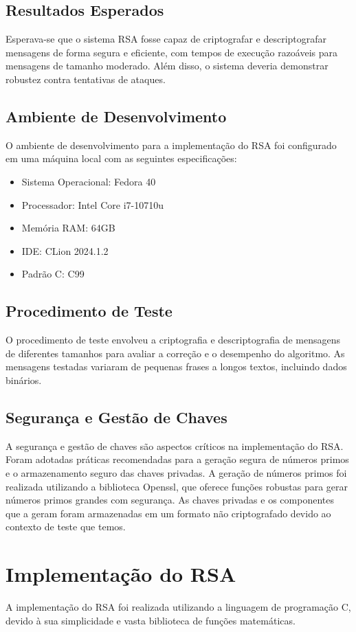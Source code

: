 \documentclass[a4paper,12pt]{article}
\begin{document}
\subsection*{Resultados Esperados}
Esperava-se que o sistema RSA fosse capaz de criptografar e descriptografar mensagens de forma segura e eficiente, com tempos de execução razoáveis para mensagens de tamanho moderado. Além disso, o sistema deveria demonstrar robustez contra tentativas de ataques.

\subsection*{Ambiente de Desenvolvimento}
O ambiente de desenvolvimento para a implementação do RSA foi configurado em uma máquina local com as seguintes especificações:
\begin{itemize}
    \item Sistema Operacional: Fedora 40
    \item Processador: Intel Core i7-10710u
    \item Memória RAM: 64GB
    \item IDE: CLion 2024.1.2
    \item Padrão C: C99
\end{itemize}

\subsection*{Procedimento de Teste}
O procedimento de teste envolveu a criptografia e descriptografia de mensagens de diferentes tamanhos para avaliar a correção e o desempenho do algoritmo. As mensagens testadas variaram de pequenas frases a longos textos, incluindo dados binários.

\subsection*{Segurança e Gestão de Chaves}
A segurança e gestão de chaves são aspectos críticos na implementação do RSA. Foram adotadas práticas recomendadas para a geração segura de números primos e o armazenamento seguro das chaves privadas. A geração de números primos foi realizada utilizando a biblioteca Openssl, que oferece funções robustas para gerar números primos grandes com segurança. As chaves privadas e os componentes que a geram foram armazenadas em um formato não criptografado devido ao contexto de teste que temos.

\section*{Implementação do RSA}
A implementação do RSA foi realizada utilizando a linguagem de programação C, devido à sua simplicidade e vasta biblioteca de funções matemáticas.
\end{document}
